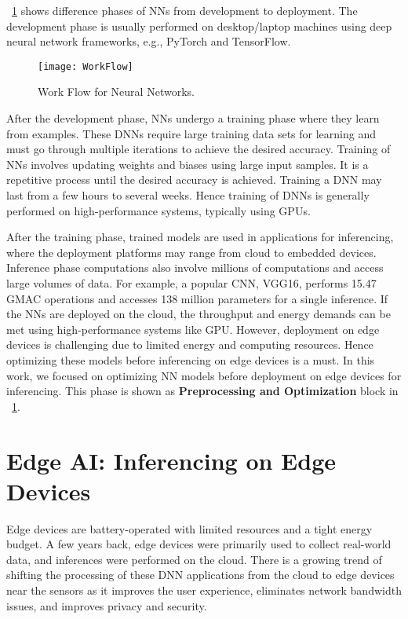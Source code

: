 \figurename{~\ref{fig:workFlow}} shows difference phases of NNs from development to deployment. The development phase is usually performed on desktop/laptop machines using deep neural network frameworks, e.g., PyTorch and TensorFlow. 
\begin{figure}[!htb]
	\centering
	\captionsetup{font=sf}
	\texttt{[image: WorkFlow]}
	\caption{Work Flow for Neural Networks.}
	\label{fig:workFlow}
\end{figure}
After the development phase, NNs undergo a training phase where they learn from examples. These DNNs require large training data sets for learning and must go through multiple iterations to achieve the desired accuracy. Training of NNs involves updating weights and biases using large input samples. It is a repetitive process until the desired accuracy is achieved. Training a DNN may last from a few hours to several weeks. Hence training of DNNs is generally performed on high-performance systems, typically using GPUs. 

After the training phase, trained models are used in applications for inferencing, where the deployment platforms may range from cloud to embedded devices. Inference phase computations also involve millions of computations and access large volumes of data. For example, a popular CNN, VGG16, performs 15.47 GMAC operations and accesses 138 million parameters for a single inference. If the NNs are deployed on the cloud, the throughput and energy demands can be met using high-performance systems like GPU. However,  deployment on edge devices is challenging due to limited energy and computing resources. Hence optimizing these models before inferencing on edge devices is a must. In this work, we focused on optimizing NN models before deployment on edge devices for inferencing. This phase is shown as \textbf{Preprocessing and Optimization} block in \figurename{~\ref{fig:workFlow}}.

\section{Edge AI: Inferencing on Edge Devices}
Edge devices are battery-operated with limited resources and a tight energy budget. A few years back, edge devices were primarily used to collect real-world data, and inferences were performed on the cloud. There is a growing trend of shifting the processing of these DNN applications from the cloud to edge devices near the sensors as it improves the user experience, eliminates network bandwidth issues, and improves privacy and security. 


